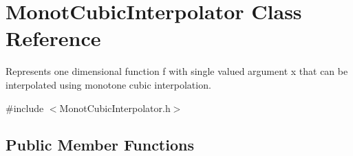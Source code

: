 \hypertarget{class_monot_cubic_interpolator}{\section{Monot\+Cubic\+Interpolator Class Reference}
\label{class_monot_cubic_interpolator}
}


Represents one dimensional function f with single valued argument x that can be interpolated using monotone cubic interpolation.  




{\ttfamily \#include $<$Monot\+Cubic\+Interpolator.\+h$>$}

\subsection*{Public Member Functions}
